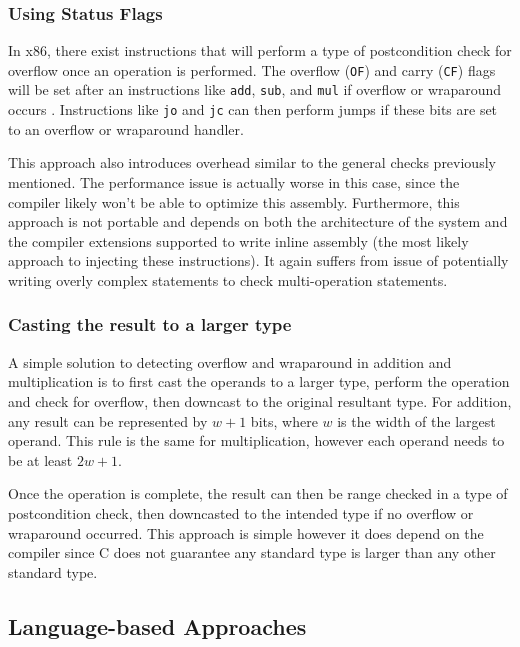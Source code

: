 \subsubsection{Using Status Flags}

In x86, there exist instructions that will perform a type of postcondition check for overflow once an operation is performed. The overflow (\texttt{OF}) and carry (\texttt{CF}) flags will be set after an instructions like \texttt{add}, \texttt{sub}, and \texttt{mul} if overflow or wraparound occurs \cite{x86}. Instructions like \texttt{jo} and \texttt{jc} can then perform jumps if these bits are set to an overflow or wraparound handler.

This approach also introduces overhead similar to the general checks previously mentioned. The performance issue is actually worse in this case, since the compiler likely won't be able to optimize this assembly. Furthermore, this approach is not portable and depends on both the architecture of the system and the compiler extensions supported to write inline assembly (the most likely approach to injecting these instructions). It again suffers from issue of potentially writing overly complex statements to check multi-operation statements.

\subsubsection{Casting the result to a larger type}

A simple solution to detecting overflow and wraparound in addition and multiplication is to first cast the operands to a larger type, perform the operation and check for overflow, then downcast to the original resultant type. For addition, any result can be represented by $w+1$ bits, where $w$ is the width of the largest operand. This rule is the same for multiplication, however each operand needs to be at least $2w+1$.

Once the operation is complete, the result can then be range checked in a type of postcondition check, then downcasted to the intended type if no overflow or wraparound occurred. This approach is simple however it does depend on the compiler since C does not guarantee any standard type is larger than any other standard type.

\subsection{Language-based Approaches}

